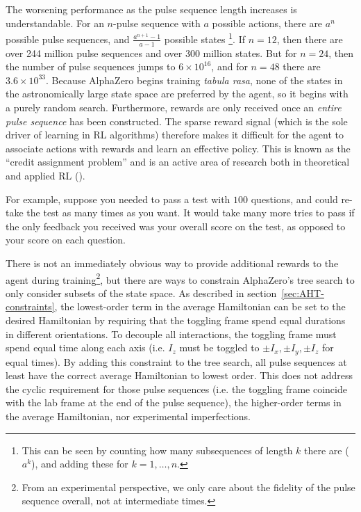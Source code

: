 The worsening performance as the pulse sequence length increases is understandable. For an $n$-pulse sequence with $a$ possible actions, there are $a^n$ possible pulse sequences, and $\frac{a^{n+1} - 1}{a-1}$ possible states%
\footnote{
This can be seen by counting how many subsequences of length $k$ there are ($a^k$), and adding these for $k = 1, \dots, n$.
}.
If $n=12$, then there are over 244 million pulse sequences and over 300 million states.
But for $n=24$, then the number of pulse sequences jumps to $6 \times 10^{16}$, and for $n=48$ there are $3.6 \times 10^{33}$. Because AlphaZero begins training \emph{tabula rasa}, none of the states in the astronomically large state space are preferred by the agent, so it begins with a purely random search.
Furthermore, rewards are only received once an \emph{entire pulse sequence} has been constructed. The sparse reward signal (which is the sole driver of learning in RL algorithms) therefore makes it difficult for the agent to associate actions with rewards and learn an effective policy.
This is known as the ``credit assignment problem'' and is an active area of research both in theoretical and applied RL (\cite{arumugam2021informationtheoretic}).

For example, suppose you needed to pass a test with $100$ questions, and could re-take the test as many times as you want. It would take many more tries to pass if the only feedback you received was your overall score on the test, as opposed to your score on each question.

There is not an immediately obvious way to provide additional rewards to the agent during training\footnote{
From an experimental perspective, we only care about the fidelity of the pulse sequence overall, not at intermediate times.
},
but there are ways to constrain AlphaZero's tree search to only consider subsets of the state space.
As described in section~\ref{sec:AHT-constraints}, the lowest-order term in the average Hamiltonian can be set to the desired Hamiltonian by
requiring that the toggling frame spend equal durations in different orientations.
To decouple all interactions, the toggling frame must spend equal time along each axis (i.e. $I_z$ must be toggled to $\pm I_x, \pm I_y, \pm I_z$ for equal times).
By adding this constraint to the tree search, all pulse sequences at least have the correct average Hamiltonian to lowest order. This does not address the cyclic requirement for those pulse sequences (i.e. the toggling frame coincide with the lab frame at the end of the pulse sequence), the higher-order terms in the average Hamiltonian, nor experimental imperfections.

